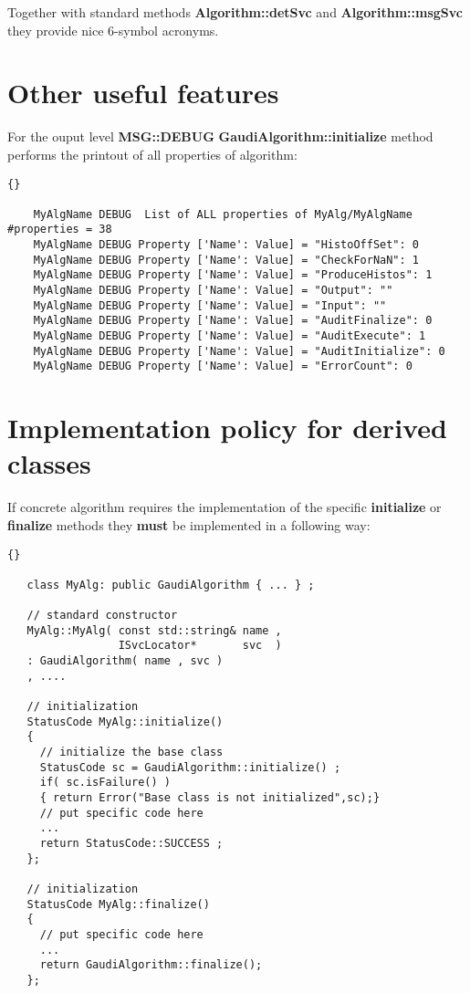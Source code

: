 \documentclass{lhcbnote}
\newcommand{\bftt}         {\ttfamily\bfseries}
\begin{document}
Together with standard methods {\bftt{Algorithm::detSvc}} and 
{\bftt{Algorithm::msgSvc}} they provide nice 6-symbol acronyms.


\section{Other useful features}
For the ouput level {\bftt{MSG::DEBUG}}
{\bftt{GaudiAlgorithm::initialize}} method performs the 
printout of all properties of algorithm:

\begin{scriptsize}
  \begin{lstlisting}{}

    MyAlgName DEBUG  List of ALL properties of MyAlg/MyAlgName   #properties = 38
    MyAlgName DEBUG Property ['Name': Value] = "HistoOffSet": 0
    MyAlgName DEBUG Property ['Name': Value] = "CheckForNaN": 1
    MyAlgName DEBUG Property ['Name': Value] = "ProduceHistos": 1
    MyAlgName DEBUG Property ['Name': Value] = "Output": ""
    MyAlgName DEBUG Property ['Name': Value] = "Input": ""
    MyAlgName DEBUG Property ['Name': Value] = "AuditFinalize": 0
    MyAlgName DEBUG Property ['Name': Value] = "AuditExecute": 1
    MyAlgName DEBUG Property ['Name': Value] = "AuditInitialize": 0
    MyAlgName DEBUG Property ['Name': Value] = "ErrorCount": 0

  \end{lstlisting}
\end{scriptsize}


\section{Implementation policy for derived classes}
If concrete algorithm requires the implementation of 
the specific {\bftt{initialize}} or 
{\bftt{finalize}} methods they {\bftt{must}} be implemented 
in a following way:

\begin{scriptsize}
 \begin{lstlisting}{}

   class MyAlg: public GaudiAlgorithm { ... } ;

   // standard constructor 
   MyAlg::MyAlg( const std::string& name , 
                 ISvcLocator*       svc  ) 
   : GaudiAlgorithm( name , svc ) 
   , ....
    
   // initialization
   StatusCode MyAlg::initialize() 
   {
     // initialize the base class 
     StatusCode sc = GaudiAlgorithm::initialize() ;
     if( sc.isFailure() ) 
     { return Error("Base class is not initialized",sc);}
     // put specific code here 
     ...
     return StatusCode::SUCCESS ;
   };
   
   // initialization
   StatusCode MyAlg::finalize() 
   {
     // put specific code here 
     ...
     return GaudiAlgorithm::finalize();
   };

 \end{lstlisting}
\end{scriptsize}
\end{document}
